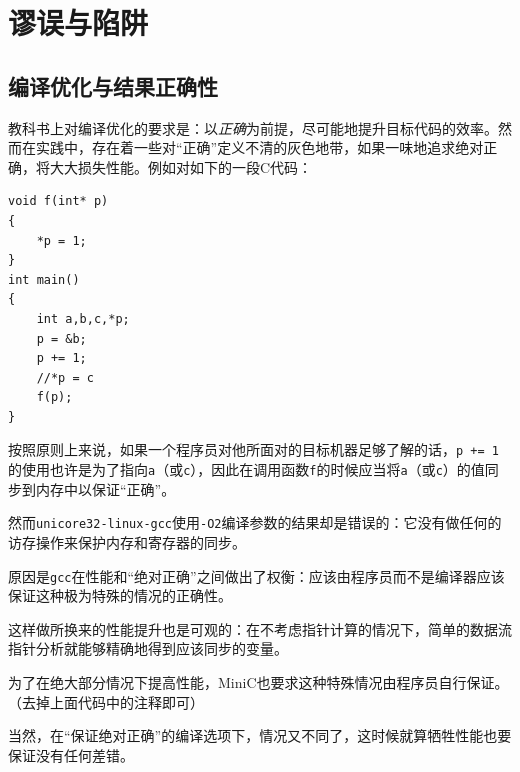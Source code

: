 \section{谬误与陷阱}
\label{tarpitc3}
\subsection*{编译优化与结果正确性}
教科书上对编译优化的要求是：以\emph{正确}为前提，尽可能地提升目标代码的效率。然而在实践中，存在着一些对“正确”定义不清的灰色地带，如果一味地追求绝对正确，将大大损失性能。例如对如下的一段C代码：
\begin{lstlisting}
void f(int* p)
{
	*p = 1;
}
int main()
{
	int a,b,c,*p;
	p = &b;
	p += 1;
	//*p = c 
	f(p);
}
\end{lstlisting}
按照原则上来说，如果一个程序员对他所面对的目标机器足够了解的话，\verb|p += 1|的使用也许是为了指向\verb|a|（或\verb|c|），因此在调用函数\verb|f|的时候应当将\verb|a|（或\verb|c|）的值同步到内存中以保证“正确”。

然而\verb|unicore32-linux-gcc|使用\verb|-O2|编译参数的结果却是错误的：它没有做任何的访存操作来保护内存和寄存器的同步。

原因是\verb|gcc|在性能和“绝对正确”之间做出了权衡：应该由程序员而不是编译器应该保证这种极为特殊的情况的正确性。

这样做所换来的性能提升也是可观的：在不考虑指针计算的情况下，简单的数据流指针分析就能够精确地得到应该同步的变量。

为了在绝大部分情况下提高性能，MiniC也要求这种特殊情况由程序员自行保证。（去掉上面代码中的注释即可）

当然，在“保证绝对正确”的编译选项下，情况又不同了，这时候就算牺牲性能也要保证没有任何差错。


